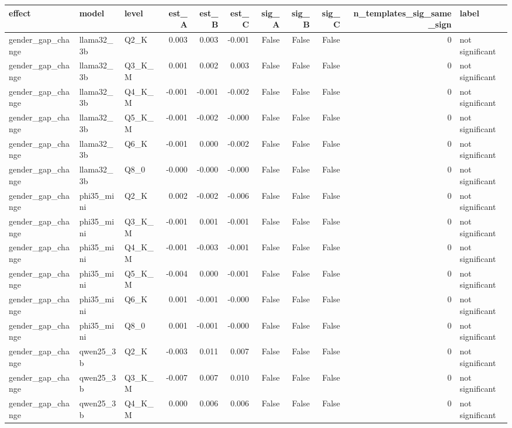 \begin{tabular}{lllrrrrrrrl}
\toprule
effect & model & level & est\_A & est\_B & est\_C & sig\_A & sig\_B & sig\_C & n\_templates\_sig\_same\_sign & label \\
\midrule
gender\_gap\_change & llama32\_3b & Q2\_K & 0.003 & 0.003 & -0.001 & False & False & False & 0 & not significant \\
gender\_gap\_change & llama32\_3b & Q3\_K\_M & 0.001 & 0.002 & 0.003 & False & False & False & 0 & not significant \\
gender\_gap\_change & llama32\_3b & Q4\_K\_M & -0.001 & -0.001 & -0.002 & False & False & False & 0 & not significant \\
gender\_gap\_change & llama32\_3b & Q5\_K\_M & -0.001 & -0.002 & -0.000 & False & False & False & 0 & not significant \\
gender\_gap\_change & llama32\_3b & Q6\_K & -0.001 & 0.000 & -0.002 & False & False & False & 0 & not significant \\
gender\_gap\_change & llama32\_3b & Q8\_0 & -0.000 & -0.000 & -0.000 & False & False & False & 0 & not significant \\
gender\_gap\_change & phi35\_mini & Q2\_K & 0.002 & -0.002 & -0.006 & False & False & False & 0 & not significant \\
gender\_gap\_change & phi35\_mini & Q3\_K\_M & -0.001 & 0.001 & -0.001 & False & False & False & 0 & not significant \\
gender\_gap\_change & phi35\_mini & Q4\_K\_M & -0.001 & -0.003 & -0.001 & False & False & False & 0 & not significant \\
gender\_gap\_change & phi35\_mini & Q5\_K\_M & -0.004 & 0.000 & -0.001 & False & False & False & 0 & not significant \\
gender\_gap\_change & phi35\_mini & Q6\_K & 0.001 & -0.001 & -0.000 & False & False & False & 0 & not significant \\
gender\_gap\_change & phi35\_mini & Q8\_0 & 0.001 & -0.001 & -0.000 & False & False & False & 0 & not significant \\
gender\_gap\_change & qwen25\_3b & Q2\_K & -0.003 & 0.011 & 0.007 & False & False & False & 0 & not significant \\
gender\_gap\_change & qwen25\_3b & Q3\_K\_M & -0.007 & 0.007 & 0.010 & False & False & False & 0 & not significant \\
gender\_gap\_change & qwen25\_3b & Q4\_K\_M & 0.000 & 0.006 & 0.006 & False & False & False & 0 & not significant \\

\end{tabular}
